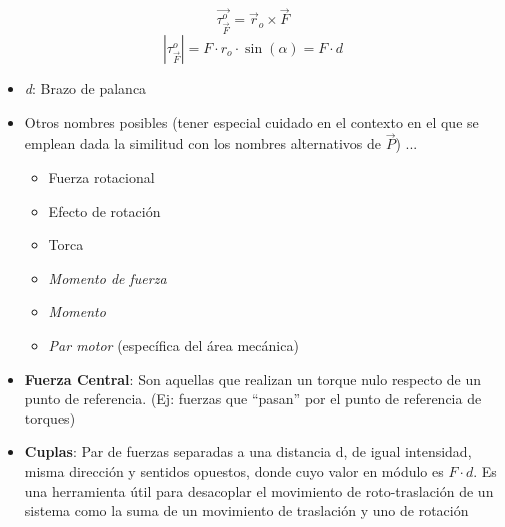         \begin{equation}
            \overrightarrow{\tau_{\vec{F}}^{o}} = \vec{r}_o \times \vec{F}
        \end{equation}
        \begin{equation}
            \left|{\tau_{\vec{F}}^{o}}\right| = F \cdot r_o \cdot \sin{(\alpha)} = F \cdot d
        \end{equation}
        
        \begin{center}
        \end{center}
        \begin{itemize}
            \item \textit{d}: Brazo de palanca
            \item Otros nombres posibles (tener especial cuidado en el contexto en el que se emplean dada la similitud con los nombres alternativos de $\vec{P}$) ...
                \begin{itemize}
                    \item Fuerza rotacional
                    \item Efecto de rotación
                    \item Torca
                    \item \textit{Momento de fuerza} 
                    \item \textit{Momento}
                    \item \textit{Par motor} (específica del área mecánica)
                \end{itemize}
            \item \textbf{Fuerza Central}: Son aquellas que realizan un torque nulo respecto de un punto de referencia. (Ej: fuerzas que ``pasan'' por el punto de referencia de torques)
            \item \textbf{Cuplas}: Par de fuerzas separadas a una distancia d, de igual intensidad, misma dirección y sentidos opuestos, donde cuyo valor en módulo es $F\cdot d$. Es una herramienta útil para desacoplar el movimiento de roto-traslación de un sistema como la suma de un movimiento de traslación y uno de rotación
        \end{itemize}
